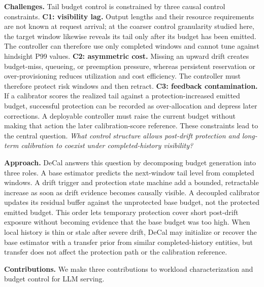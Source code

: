 \documentclass[sigplan,10pt, anonymous]{acmart}
\begin{document}
{\bfseries Challenges.}
Tail budget control is constrained by three causal control constraints. \textbf{C1: visibility lag.} Output lengths and their resource requirements are not known at request arrival; at the coarser control granularity studied here, the target window likewise reveals its tail only after its budget has been emitted. The controller can therefore use only completed windows and cannot tune against hindsight P99 values. \textbf{C2: asymmetric cost.} Missing an upward drift creates budget-miss, queueing, or preemption pressure, whereas persistent reservation or over-provisioning reduces utilization and cost efficiency. The controller must therefore protect risk windows and then retract. \textbf{C3: feedback contamination.} If a calibrator scores the realized tail against a protection-increased emitted budget, successful protection can be recorded as over-allocation and depress later corrections. A deployable controller must raise the current budget without making that action the later calibration-score reference. These constraints lead to the central question.
\emph{What control structure allows post-drift protection and long-term calibration to coexist under completed-history visibility?}


{\bfseries Approach.}
DeCal answers this question by decomposing budget generation into three roles. A base estimator predicts the next-window tail level from completed windows. A drift trigger and protection state machine add a bounded, retractable increase as soon as drift evidence becomes causally visible. A decoupled calibrator updates its residual buffer against the unprotected base budget, not the protected emitted budget. This order lets temporary protection cover short post-drift exposure without becoming evidence that the base budget was too high. When local history is thin or stale after severe drift, DeCal may initialize or recover the base estimator with a transfer prior from similar completed-history entities, but transfer does not affect the protection path or the calibration reference.

{\bfseries Contributions.} We make three contributions to workload characterization and budget control for LLM serving.
\end{document}
